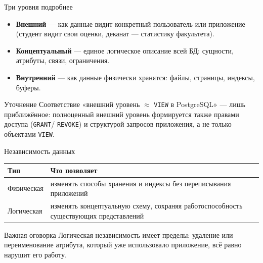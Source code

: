 \documentclass[aspectratio=169]{beamer}
\begin{document}
\begin{frame}{Три уровня подробнее}

\begin{itemize}
  \item \textbf{Внешний} — как данные видит конкретный
        пользователь или приложение (студент видит свои
        оценки, деканат — статистику факультета).
  \item \textbf{Концептуальный} — единое логическое описание
        всей БД: сущности, атрибуты, связи, ограничения.
  \item \textbf{Внутренний} — как данные физически хранятся:
        файлы, страницы, индексы, буферы.
\end{itemize}

\vspace{0.3cm}

\begin{alertblock}{Уточнение}
Соответствие «внешний уровень $\approx$ \texttt{VIEW}
в PostgreSQL» — лишь приближённое: полноценный внешний
уровень формируется также правами доступа (\texttt{GRANT}/
\texttt{REVOKE}) и структурой запросов приложения,
а не только объектами \texttt{VIEW}.
\end{alertblock}

\end{frame}


\begin{frame}{Независимость данных}

\begin{table}
\centering
\begin{tabular}{p{}|p{}}
\toprule
\textbf{Тип} & \textbf{Что позволяет}\\
\midrule
Физическая &
изменять способы хранения и индексы
без переписывания приложений\\
Логическая &
изменять концептуальную схему,
сохраняя работоспособность существующих представлений\\
\bottomrule
\end{tabular}
\end{table}

\vspace{0.4cm}

\begin{alertblock}{Важная оговорка}
Логическая независимость имеет пределы: удаление или
переименование атрибута, который уже использовало
приложение, всё равно нарушит его работу.
\end{alertblock}

\end{frame}
\end{document}
